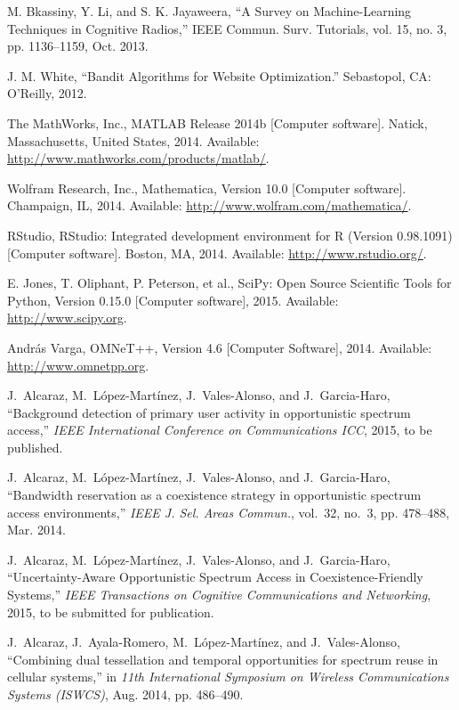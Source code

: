 \begin{thebibliography}{1}
 M. Bkassiny, Y. Li, and S. K. Jayaweera, \enquote{A Survey on Machine-Learning Techniques in Cognitive Radios,} IEEE Commun. Surv. Tutorials, vol. 15, no. 3, pp. 1136–1159, Oct. 2013.

 J. M. White, \enquote{Bandit Algorithms for Website Optimization.} Sebastopol, CA: O’Reilly, 2012.

 The MathWorks, Inc., MATLAB Release 2014b [Computer software]. Natick, Massachusetts, United States, 2014. Available: \url{http://www.mathworks.com/products/matlab/}.

 Wolfram Research, Inc., Mathematica, Version 10.0 [Computer software]. Champaign, IL, 2014. Available: \url{http://www.wolfram.com/mathematica/}.

 RStudio, RStudio: Integrated development environment for R (Version 0.98.1091) [Computer software]. Boston, MA, 2014.
Available: \url{http://www.rstudio.org/}.

 E. Jones, T. Oliphant, P. Peterson, et al., SciPy: Open Source Scientific Tools for Python, Version 0.15.0 [Computer software], 2015. Available: \url{http://www.scipy.org}.

 Andr\'{a}s Varga, OMNeT++, Version 4.6 [Computer Software], 2014. Available: \url{http://www.omnetpp.org}.

J.~Alcaraz, M.~L\'{o}pez-Mart\'{i}nez, J.~Vales-Alonso, and J.~Garcia-Haro,
  ``Background detection of primary user activity in opportunistic spectrum
  access,'' \emph{{IEEE} International Conference on Communications {ICC}},
  2015, to be published.
  
J.~Alcaraz, M.~L\'{o}pez-Mart\'{i}nez, J.~Vales-Alonso, and J.~Garcia-Haro, ``Bandwidth reservation as a coexistence strategy in opportunistic
  spectrum access environments,'' \emph{{IEEE} J. Sel. Areas Commun.}, vol.~32,
  no.~3, pp. 478--488, Mar. 2014.

J.~Alcaraz, M.~L\'{o}pez-Mart\'{i}nez, J.~Vales-Alonso, and J.~Garcia-Haro, ``Uncertainty-Aware Opportunistic Spectrum Access in Coexistence-Friendly Systems,'' \emph{{IEEE} Transactions on Cognitive
  Communications and Networking}, 2015, to be submitted for publication.

J.~Alcaraz, J.~Ayala-Romero, M.~L\'{o}pez-Mart\'{i}nez, and J.~Vales-Alonso,
  ``Combining dual tessellation and temporal opportunities for spectrum reuse
  in cellular systems,'' in \emph{11th International Symposium on Wireless
  Communications Systems ({ISWCS})}, Aug. 2014, pp. 486--490.


\end{thebibliography}
